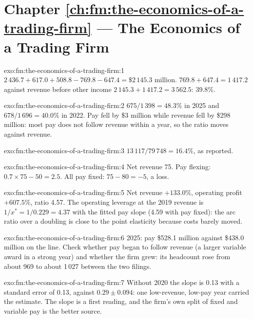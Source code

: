 \section*{Chapter \ref{ch:fm:the-economics-of-a-trading-firm} --- The Economics of a Trading Firm}

\begin{solution}{exo:fm:the-economics-of-a-trading-firm:1}
$2\,436.7+617.0+508.8-769.8-647.4=\$2\,145.3$ million.  $769.8+647.4=1\,417.2$ against revenue before other income
$2\,145.3+1\,417.2=3\,562.5$: 39.8\%.
\end{solution}

\begin{solution}{exo:fm:the-economics-of-a-trading-firm:2}
$675/1\,398=48.3\%$ in 2025 and $678/1\,696=40.0\%$ in 2022. Pay fell by \$3 million while revenue fell by \$298 million: most pay does not follow
revenue within a year, so the ratio moves against revenue.
\end{solution}

\begin{solution}{exo:fm:the-economics-of-a-trading-firm:3}
$13\,117/79\,748=16.4\%$, as reported.
\end{solution}

\begin{solution}{exo:fm:the-economics-of-a-trading-firm:4}
Net revenue 75. Pay flexing: $0.7\times75-50=2.5$. All pay fixed: $75-80=-5$, a loss.
\end{solution}

\begin{solution}{exo:fm:the-economics-of-a-trading-firm:5}
Net revenue $+133.0\%$, operating profit $+607.5\%$, ratio 4.57. The operating leverage at the 2019 revenue is $1/x^\ast=1/0.229=4.37$ with the
fitted pay slope (4.59 with pay fixed): the arc ratio over a doubling is close to the point elasticity because costs barely moved.
\end{solution}

\begin{solution}{exo:fm:the-economics-of-a-trading-firm:6}
2025: pay \$528.1 million against \$438.0 million on the line. Check whether pay began to follow revenue (a larger variable award in a strong year)
and whether the firm grew: its headcount rose from about 969 to about 1\,027 between the two filings.
\end{solution}

\begin{solution}{exo:fm:the-economics-of-a-trading-firm:7}
Without 2020 the slope is 0.13 with a standard error of 0.13, against $0.29\pm0.094$: one low-revenue, low-pay year carried the estimate. The
slope is a first reading, and the firm's own split of fixed and variable pay is the better source.
\end{solution}

